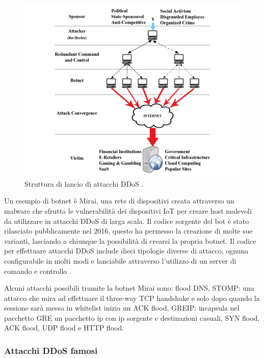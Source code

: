 \begin{figure}[h]
    \includegraphics[width=\hsize]{images/introduzione/struttura_botnets_2.png}
    \caption{Struttura di lancio di attacchi DDoS \cite{ddos_survey_4}.}
    \centering
\end{figure}

Un esempio di botnet è Mirai, una rete di dispositivi creata attraverso un malware che sfrutta le vulnerabilità dei dispositivi IoT per creare host malevoli da utilizzare in attacchi DDoS di larga scala. Il codice sorgente del bot è stato rilasciato pubblicamente nel 2016, questo ha permesso la creazione di molte sue varianti, lasciando a chiunque la possibilità  di crearsi la propria botnet.
Il codice per effettuare attacchi DDoS include dieci tipologie diverse di attacco, ognuna configurabile in molti modi e lanciabile attraverso l'utilizzo di un server di comando e controllo \cite{slide_mirai}.

Alcuni attacchi possibili tramite la botnet Mirai sono: flood DNS, STOMP: una attacco che mira ad effettuare il three-way TCP handshake e solo dopo quando la sessione sarà messa in whitelist inizia un ACK flood, GREIP: incapsula nel pacchetto GRE un pacchetto ip con ip sorgente e destinazioni casuali, SYN flood, ACK flood, UDP flood e HTTP flood.

\subsubsection{Attacchi DDoS famosi}

